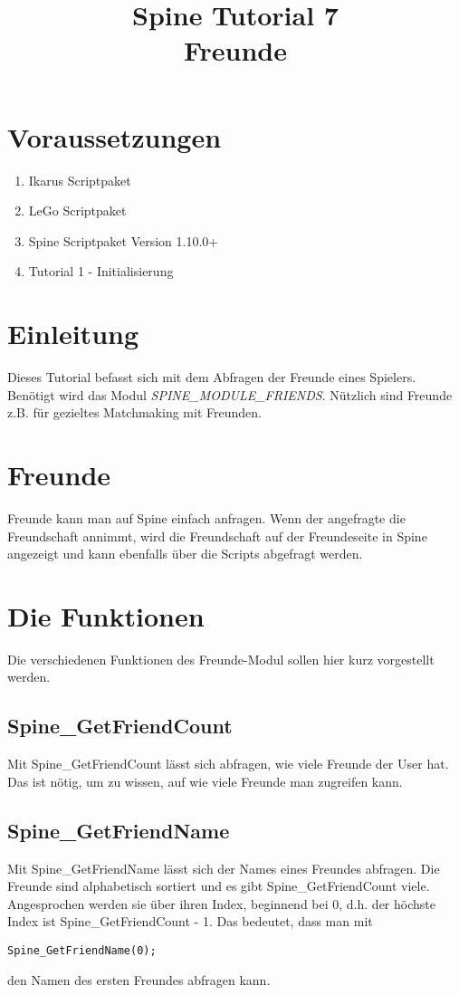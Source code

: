 \documentclass{article}
\title{Spine Tutorial 7 \\ Freunde}
\begin{document}
\section{Voraussetzungen}

\begin{enumerate}
\item Ikarus Scriptpaket
\item LeGo Scriptpaket
\item Spine Scriptpaket Version 1.10.0+
\item Tutorial 1 - Initialisierung
\end{enumerate}

\section{Einleitung}

Dieses Tutorial befasst sich mit dem Abfragen der Freunde eines Spielers. Benötigt wird das Modul \textit{SPINE\_MODULE\_FRIENDS}. Nützlich sind Freunde z.B. für gezieltes Matchmaking mit Freunden.

\section{Freunde}

Freunde kann man auf Spine einfach anfragen. Wenn der angefragte die Freundschaft annimmt, wird die Freundschaft auf der Freundeseite in Spine angezeigt und kann ebenfalls über die Scripts abgefragt werden.

\section{Die Funktionen}

Die verschiedenen Funktionen des Freunde-Modul sollen hier kurz vorgestellt werden.

\subsection{Spine\_GetFriendCount}

Mit Spine\_GetFriendCount lässt sich abfragen, wie viele Freunde der User hat. Das ist nötig, um zu wissen, auf wie viele Freunde man zugreifen kann.

\subsection{Spine\_GetFriendName}

Mit Spine\_GetFriendName lässt sich der Names eines Freundes abfragen. Die Freunde sind alphabetisch sortiert und es gibt Spine\_GetFriendCount viele. Angesprochen werden sie über ihren Index, beginnend bei 0, d.h. der höchste Index ist Spine\_GetFriendCount - 1. Das bedeutet, dass man mit

\begin{lstlisting}
Spine_GetFriendName(0);
\end{lstlisting}

den Namen des ersten Freundes abfragen kann.
\end{document}
